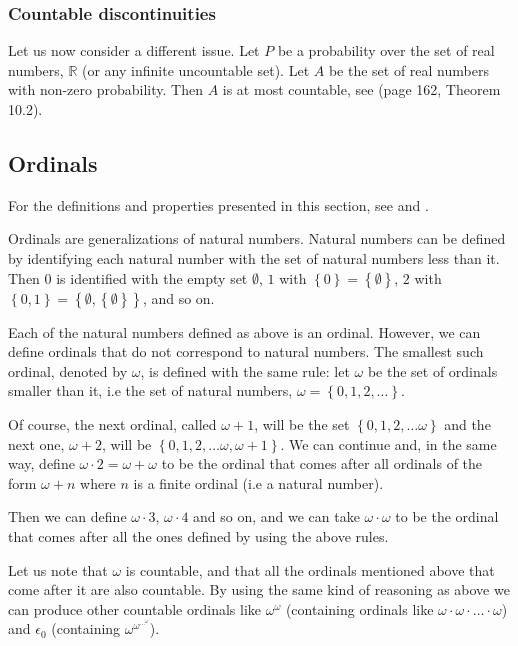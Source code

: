 \documentclass[a4paper
,draft
]{article}
\def\reale{\mathbb{R}}
\newcommand{\multime}[1]{\left\{ #1 \right\}}
\begin{document}
\subsubsection{Countable discontinuities}

Let us now consider a different issue.
Let $P$ be a probability over the set of real numbers, $\reale$ (or
any infinite uncountable set).
Let $A$ be the set of real numbers with non-zero probability.
Then $A$ is at most countable, see \textcite{Billingsley1995} (page 162, Theorem 10.2).

\subsection{Ordinals}
\label{sec:ordinals}

For the definitions and properties presented in this section,
see \textcite{sep-set-theory} and \textcite{Cohen1966}.

Ordinals are generalizations of natural numbers. Natural numbers can be
defined by identifying each natural number with the set of natural numbers less
than it. Then $0$ is identified with the empty set $\emptyset$,
$1$ with $\multime{0}=\multime{\emptyset}$,
$2$ with $\multime{0, 1}=\multime{\emptyset, \multime{\emptyset}}$,
and so on.

Each of the natural numbers defined as above is an ordinal.
However, we can define ordinals that do not correspond to natural numbers.
The smallest such ordinal, denoted by $\omega$, is defined with the same rule:
let $\omega$ be the set of ordinals smaller than it, i.e
the set of natural numbers, $\omega=\multime{0, 1, 2, \dots}$.

Of course, the next ordinal, called $\omega + 1$, will be the set
$\multime{0, 1, 2, \dots \omega}$ and the next one,
$\omega+2$, will be $\multime{0, 1, 2, \dots \omega, \omega+1}$. We can
continue and, in the same way, define $\omega\cdot 2=\omega+\omega$ to be
the ordinal that comes after all ordinals of the form $\omega+n$
where $n$ is a finite ordinal (i.e a natural number).

Then we can define $\omega\cdot 3$, $\omega\cdot 4$ and so on, and we can
take $\omega\cdot \omega$ to be the ordinal that comes after all the ones
defined by using the above rules.

Let us note that $\omega$ is countable, and that all the ordinals mentioned
above that come after it are also countable.
By using the same kind of
reasoning as above we can produce other countable ordinals like
$\omega^\omega$ (containing ordinals like $\omega\cdot\omega\cdot\dots\cdot\omega$)
and $\epsilon_0$ (containing $\omega^{\omega^{\cdots^\omega}}$).
\end{document}
